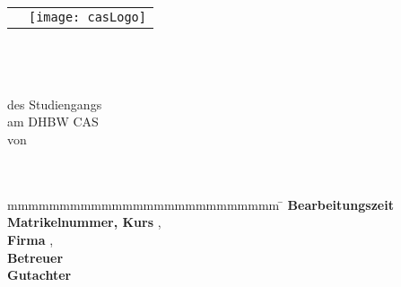 \begin{titlepage}
	\begin{longtable}{p{8.2cm} p{5.4cm}}
		&
		\texttt{[image: casLogo]}
	\end{longtable}
	\addtocounter{table}{-1}
	\enlargethispage{20mm}
	\begin{center}
		\vspace*{12mm}	{\LARGE\textbf \myTitel }\\
		\vspace*{12mm}	{\large\textbf \myArbeit}\\
		\vspace*{3mm}		{\textbf \myDegree}\\
		\vspace*{12mm}	des Studiengangs \myKurs\\
    \vspace*{3mm}		am DHBW CAS\\
		\vspace*{12mm}	von\\
		\vspace*{3mm}		{\large\textbf \myAutor}\\
		\vspace*{12mm}	\myDatum\\
	\end{center}
	\vfill
	\begin{spacing}{1.2}
	\begin{tabbing}
		mmmmmmmmmmmmmmmmmmmmmmmmmm             \= \kill
		\textbf{Bearbeitungszeit}       \>  \myBearbeitungszeit\\
		\textbf{Matrikelnummer, Kurs}  \>  \myMatrikelnr, \myKurs\\
		\textbf{Firma}                  \>  \myFirma, \myFirmenort\\
		\textbf{Betreuer}               \>  \myBetreuer\\
		\textbf{Gutachter}              \>  \myGutachter
	\end{tabbing}
	\end{spacing}
\end{titlepage}